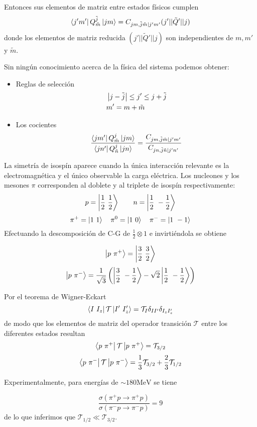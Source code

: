 Entonces sus elementos de matriz entre estados físicos cumplen 
\begin{equation}
\left\langle j'm'\right|Q_{\tilde{m}}^{\tilde{j}}\left|jm\right\rangle=C_{jm,\tilde{j}\tilde{m}|j'm'} (j'||\tilde{Q}'||j)
\end{equation}
donde los elementos de matriz reducida $(j'||\tilde{Q}'||j)$ son independientes de $m,m'$ y $\tilde{m}$. \medskip

Sin ningún conocimiento acerca de la física del sistema podemos obtener:

\begin{itemize}
\item Reglas de selección
\begin{subequations}
\begin{flalign}
&\left\lvert j-\tilde{j}\right\rvert \leq j'\leq j+\tilde{j}\\
&m'=m+\tilde{m}
\end{flalign}
\end{subequations}
\item Los cocientes
\begin{equation}
\frac{\left\langle jm'\right|Q_{\tilde{m}}^j\left|jm\right\rangle}{\left\langle jn'\right|Q_{\tilde{n}}^j\left|jn\right\rangle}=\frac{C_{jm,\tilde{j}\tilde{m}|j'm'}}{C_{jn,\tilde{j}\tilde{n}|j'n'}}
\end{equation}
\end{itemize}

\begin{ejemplo}[Isospín]

La simetría de isospín aparece cuando la única interacción relevante es la electromagnética y el único observable la carga eléctrica. Los nucleones y los mesones $\pi$ corresponden al doblete y al triplete de isospín respectivamente:
$$p=\left|\frac{1}{2}\ \frac{1}{2}\right\rangle\qquad n=\left|\frac{1}{2}\ -\frac{1}{2}\right\rangle$$
$$\pi^+=\left|1\ 1\right\rangle\quad \pi^0=\left|1\ 0\right\rangle\quad \pi^-=\left|1\ -1\right\rangle$$
Efectuando la descomposición de C-G de $\frac{1}{2}\otimes 1$ e invirtiéndola se obtiene

$$\ket{p\ \pi^+}=\ket{\frac{3}{2}\ \frac{3}{2}}	$$
$$\ket{p\ \pi^-}=\frac{1}{\sqrt{3}}\left(\ket{\frac{3}{2}\ -\frac{1}{2}}	-\sqrt{2} \ket{\frac{1}{2}\ -\frac{1}{2}}	\right)$$

Por el teorema de Wigner-Eckart
$$\braopket{I\ I_z}{\mathcal{T}}{I'\ I_z'}=\mathcal{T}_I \delta_{II'} \delta_{I_zI_z'}$$
de modo que los elementos de matriz del operador transición $\mathcal{T}$ entre los diferentes estados resultan
$$\braopket{p\ \pi^+}{\mathcal{T}}{p\ \pi^+}=\mathcal{T}_{3/2}$$
$$\braopket{p\ \pi^-}{\mathcal{T}}{p\ \pi^-}=\frac{1}{3}\mathcal{T}_{3/2}+\frac{2}{3}\mathcal{T}_{1/2}$$

Experimentalmente, para energías de $\sim 180 \si{\mega\electronvolt}$ se tiene

$$\frac{\sigma(\pi^+ p\rightarrow \pi^+ p)}{\sigma(\pi^- p\rightarrow \pi^- p)}=9$$
de lo que inferimos que $\mathcal{T}_{1/2}\ll \mathcal{T}_{3/2}$.
\end{ejemplo}


